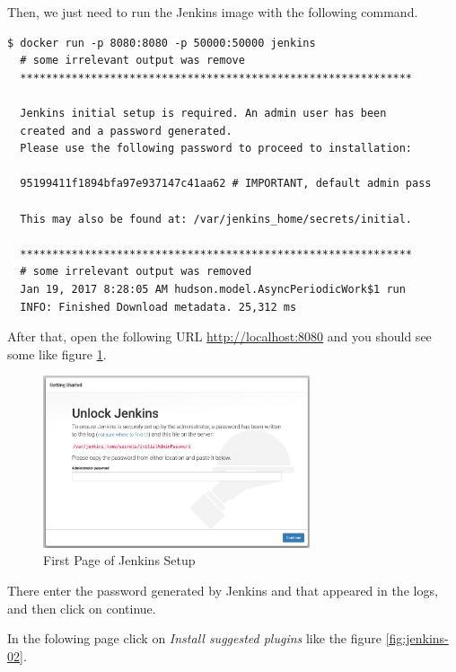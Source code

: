 Then, we just need to run the Jenkins image with the following command.

\begin{verbatim}
$ docker run -p 8080:8080 -p 50000:50000 jenkins
  # some irrelevant output was remove
  *************************************************************

  Jenkins initial setup is required. An admin user has been 
  created and a password generated.
  Please use the following password to proceed to installation:

  95199411f1894bfa97e937147c41aa62 # IMPORTANT, default admin pass

  This may also be found at: /var/jenkins_home/secrets/initial.
 
  *************************************************************
  # some irrelevant output was removed
  Jan 19, 2017 8:28:05 AM hudson.model.AsyncPeriodicWork$1 run
  INFO: Finished Download metadata. 25,312 ms
\end{verbatim}

After that, open the following URL \url{http://localhost:8080} and you should see some like figure \ref{fig:jenkins-01}.

\begin{figure}[H]
	\centering
    \includegraphics[width=0.7\textwidth]{grafiken/jenkins-01}
    \caption{First Page of Jenkins Setup}
    \label{fig:jenkins-01}
\end{figure}

There enter the password generated by Jenkins and that appeared in the logs, and then click on continue.

In the folowing page click on \textit{Install suggested plugins} like the figure \ref{fig:jenkins-02}.

